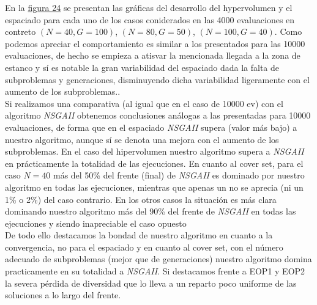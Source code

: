 En la \hyperref[fig:24]{figura 24} se presentan las gráficas del desarrollo del hypervolumen y el espaciado para cada uno de los casos coniderados en las 4000 evaluaciones en contreto $(N=40, G=100)$, $(N=80, G=50)$, $(N=100, G=40)$. Como podemos apreciar el comportamiento es similar a los presentados para las 10000 evaluaciones, de hecho se empieza a atisvar la mencionada llegada a la zona de estanco y sí es notable la gran variabilidad del espaciado dada la falta de subproblemas y generaciones, disminuyendo dicha variabilidad ligeramente con el aumento de los subproblemas..\\

Si realizamos una comparativa (al igual que en el caso de 10000 ev) con el algoritmo \textit{NSGAII} obtenemos conclusiones análogas a las presentadas para 10000 evaluaciones, de forma que en el espaciado \textit{NSGAII} supera (valor más bajo) a nuestro algoritmo, aunque sí se denota una mejora con el aumento de los subproblemas. En el caso del hipervolumen nuestro algoritmo supera a \textit{NSGAII} en prácticamente la totalidad de las ejecuciones. En cuanto al cover set,  para el caso $N=40$ más del 50\%  del frente (final) de \textit{NSGAII} es dominado por nuestro algoritmo en todas las ejecuciones, mientras que apenas un no se aprecia (ni un 1\% o 2\%) del caso contrario. En los otros casos la situación es más clara dominando nuestro algoritmo más del 90\% del frente de \textit{NSGAII} en todas las ejecuciones y siendo inapreciable el caso opuesto\\

De todo ello destacamos la bondad de nuestro algoritmo en cuanto a la convergencia, no  para el espaciado  y en cuanto al cover set, con el número adecuado de subproblemas (mejor que de generaciones) nuestro algoritmo domina practicamente en su totalidad a \textit{NSGAII}. Si destacamos frente a EOP1 y EOP2 la severa pérdida de diversidad que lo lleva a un reparto poco uniforme de las soluciones a lo largo del frente.\\

